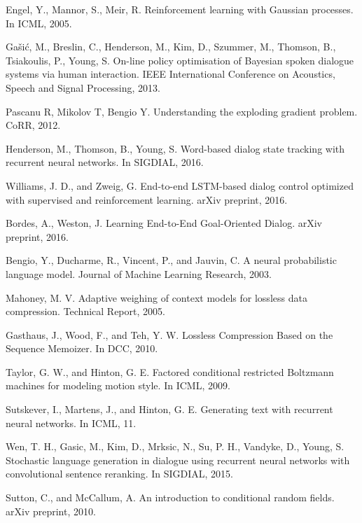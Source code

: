 \documentclass[paper=a4, fontsize=18pt]{article} %
\numberwithin{equation}{section} %
\numberwithin{figure}{section} %
\numberwithin{table}{section} %
\begin{document}
\begin{thebibliography}{10}
Engel, Y., Mannor, S., Meir, R. Reinforcement learning with Gaussian processes. In ICML, 2005.

Gašić, M., Breslin, C., Henderson, M., Kim, D., Szummer, M., Thomson, B., Tsiakoulis, P., Young, S. On-line policy optimisation of Bayesian spoken dialogue systems via human interaction. IEEE International Conference on Acoustics, Speech and Signal Processing, 2013.

Pascanu R, Mikolov T, Bengio Y. Understanding the exploding gradient problem. CoRR, 2012.

Henderson, M., Thomson, B., Young, S. Word-based dialog state tracking with recurrent neural networks. In SIGDIAL, 2016.

Williams, J. D., and Zweig, G. End-to-end LSTM-based dialog control optimized with supervised and reinforcement learning. arXiv preprint, 2016.

Bordes, A., Weston, J. Learning End-to-End Goal-Oriented Dialog. arXiv preprint, 2016.

Bengio, Y., Ducharme, R., Vincent, P., and Jauvin, C. A neural probabilistic language model. Journal of Machine Learning Research, 2003.

Mahoney, M. V. Adaptive weighing of context models for lossless data compression. Technical Report, 2005.

Gasthaus, J., Wood, F., and Teh, Y. W. Lossless Compression Based on the Sequence Memoizer. In DCC, 2010.

Taylor, G. W., and Hinton, G. E. Factored conditional restricted Boltzmann machines for modeling motion style. In ICML, 2009.

Sutskever, I., Martens, J., and Hinton, G. E. Generating text with recurrent neural networks. In ICML, 11.

Wen, T. H., Gasic, M., Kim, D., Mrksic, N., Su, P. H., Vandyke, D., Young, S. Stochastic language generation in dialogue using recurrent neural networks with convolutional sentence reranking. In SIGDIAL, 2015.

Sutton, C., and McCallum, A. An introduction to conditional random fields. arXiv preprint, 2010.


\end{thebibliography}
\end{document}

